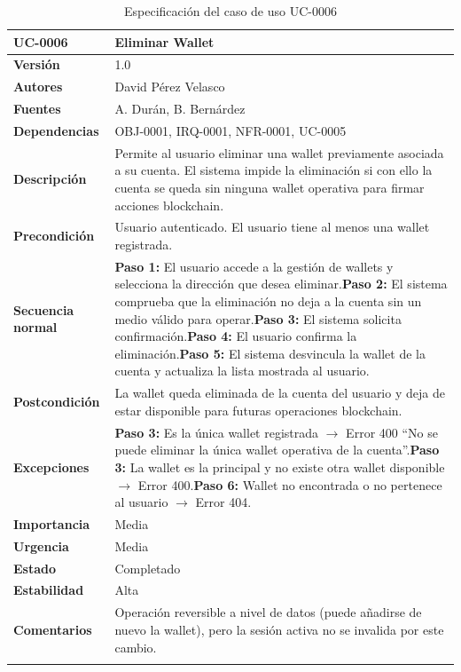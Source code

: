 \documentclass[11pt, a4paper]{article}
\begin{document}
\begin{longtable}{|p{4cm}|p{10cm}|}
\hline
\textbf{UC-0006} & Eliminar Wallet \\
\hline
\textbf{Versión} & 1.0 \\
\hline
\textbf{Autores} & David Pérez Velasco \\
\hline
\textbf{Fuentes} & A. Durán, B. Bernárdez \\
\hline
\textbf{Dependencias} & OBJ-0001, IRQ-0001, NFR-0001, UC-0005 \\
\hline
\textbf{Descripción} & Permite al usuario eliminar una wallet previamente asociada a su cuenta. El sistema impide la eliminación si con ello la cuenta se queda sin ninguna wallet operativa para firmar acciones blockchain. \\
\hline
\textbf{Precondición} & Usuario autenticado. El usuario tiene al menos una wallet registrada. \\
\hline
\textbf{Secuencia normal} & \textbf{Paso 1:} El usuario accede a la gestión de wallets y selecciona la dirección que desea eliminar.\newline\textbf{Paso 2:} El sistema comprueba que la eliminación no deja a la cuenta sin un medio válido para operar.\newline\textbf{Paso 3:} El sistema solicita confirmación.\newline\textbf{Paso 4:} El usuario confirma la eliminación.\newline\textbf{Paso 5:} El sistema desvincula la wallet de la cuenta y actualiza la lista mostrada al usuario. \\
\hline
\textbf{Postcondición} & La wallet queda eliminada de la cuenta del usuario y deja de estar disponible para futuras operaciones blockchain. \\
\hline
\textbf{Excepciones} & \textbf{Paso 3:} Es la única wallet registrada $\rightarrow$ Error 400 ``No se puede eliminar la única wallet operativa de la cuenta''.\newline\textbf{Paso 3:} La wallet es la principal y no existe otra wallet disponible $\rightarrow$ Error 400.\newline\textbf{Paso 6:} Wallet no encontrada o no pertenece al usuario $\rightarrow$ Error 404. \\
\hline
\textbf{Importancia} & Media \\
\hline
\textbf{Urgencia} & Media \\
\hline
\textbf{Estado} & Completado \\
\hline
\textbf{Estabilidad} & Alta \\
\hline
\textbf{Comentarios} & Operación reversible a nivel de datos (puede añadirse de nuevo la wallet), pero la sesión activa no se invalida por este cambio. \\
\hline
\caption{Especificación del caso de uso UC-0006}
\end{longtable}
\end{document}
